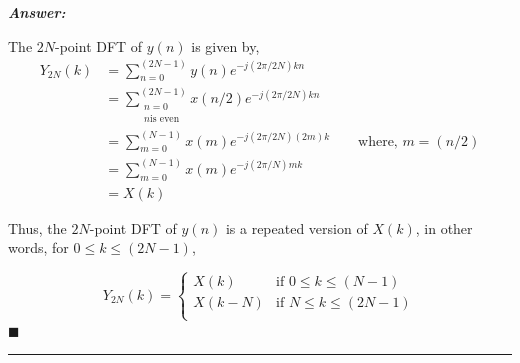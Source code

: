 \documentclass[12pt]{article}
\theoremstyle{definition}
\newenvironment{answer}{
    \textbf{\textit{Answer:}} \qquad
}{\hfill $\blacksquare$ \\ \begin{center}
    \rule{0.6\linewidth}{0.5px}    
\end{center}
}
\begin{document}
\begin{answer}
    The $2N$-point DFT of $y(n)$ is given by,
    \begin{align*}
        Y_{2N}(k)
        & = \sum_{n = 0}^{(2N - 1)} y(n) e^{-j(2\pi/2N)kn}\\
        & = \sum_{\substack{n = 0\\n \text{is even}}}^{(2N - 1)} x(n/2) e^{-j(2\pi/2N)kn}\\
        & = \sum_{m = 0}^{(N-1)} x(m)e^{-j(2\pi/2N)(2m)k} \qquad \text{where, } m = (n/2)\\
        & = \sum_{m = 0}^{(N-1)} x(m)e^{-j(2\pi/N)mk}\\
        & = X(k)
    \end{align*}

    Thus, the $2N$-point DFT of $y(n)$ is a repeated version of $X(k)$, in other words, for $0 \leq k \leq (2N-1)$,

    $$
    Y_{2N}(k) = \begin{cases}
        X(k) & \text{if } 0 \leq k \leq (N-1)\\
        X(k-N) & \text{if } N \leq k \leq (2N-1)\\
    \end{cases}
    $$
\end{answer}
\end{document}
